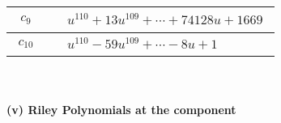 \documentclass[1p]{elsarticle_modified}
\theoremstyle{definition}
\begin{document}
\begin{tabular}{m{50pt}|m{274pt}}
\hline $$\begin{aligned}c_{9}\end{aligned}$$&$\begin{aligned}
&u^{110}+13 u^{109}+\cdots+74128 u+1669
\end{aligned}$\\
\hline $$\begin{aligned}c_{10}\end{aligned}$$&$\begin{aligned}
&u^{110}-59 u^{109}+\cdots-8 u+1
\end{aligned}$\\
\hline
\end{tabular}\\~\\
\newpage\renewcommand{\arraystretch}{1}
\flushleft \textbf{(v) Riley Polynomials at the component}\newline \\
\end{document}
